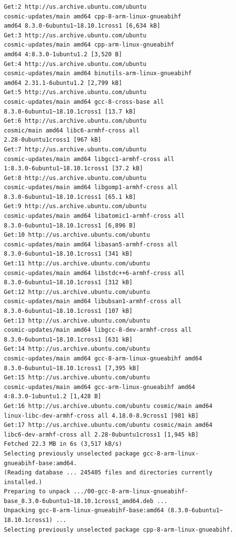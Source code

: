\begin{verbatim}
Get:2 http://us.archive.ubuntu.com/ubuntu 
cosmic-updates/main amd64 cpp-8-arm-linux-gnueabihf 
amd64 8.3.0-6ubuntu1~18.10.1cross1 [6,634 kB]
Get:3 http://us.archive.ubuntu.com/ubuntu 
cosmic-updates/main amd64 cpp-arm-linux-gnueabihf 
amd64 4:8.3.0-1ubuntu1.2 [3,520 B]
Get:4 http://us.archive.ubuntu.com/ubuntu 
cosmic-updates/main amd64 binutils-arm-linux-gnueabihf 
amd64 2.31.1-6ubuntu1.2 [2,799 kB]
Get:5 http://us.archive.ubuntu.com/ubuntu 
cosmic-updates/main amd64 gcc-8-cross-base all 
8.3.0-6ubuntu1~18.10.1cross1 [13.7 kB]
Get:6 http://us.archive.ubuntu.com/ubuntu 
cosmic/main amd64 libc6-armhf-cross all 
2.28-0ubuntu1cross1 [967 kB]
Get:7 http://us.archive.ubuntu.com/ubuntu 
cosmic-updates/main amd64 libgcc1-armhf-cross all 
1:8.3.0-6ubuntu1~18.10.1cross1 [37.2 kB]
Get:8 http://us.archive.ubuntu.com/ubuntu 
cosmic-updates/main amd64 libgomp1-armhf-cross all 
8.3.0-6ubuntu1~18.10.1cross1 [65.1 kB]
Get:9 http://us.archive.ubuntu.com/ubuntu 
cosmic-updates/main amd64 libatomic1-armhf-cross all 
8.3.0-6ubuntu1~18.10.1cross1 [6,896 B]
Get:10 http://us.archive.ubuntu.com/ubuntu 
cosmic-updates/main amd64 libasan5-armhf-cross all 
8.3.0-6ubuntu1~18.10.1cross1 [341 kB]
Get:11 http://us.archive.ubuntu.com/ubuntu 
cosmic-updates/main amd64 libstdc++6-armhf-cross all 
8.3.0-6ubuntu1~18.10.1cross1 [312 kB]
Get:12 http://us.archive.ubuntu.com/ubuntu 
cosmic-updates/main amd64 libubsan1-armhf-cross all 
8.3.0-6ubuntu1~18.10.1cross1 [107 kB]
Get:13 http://us.archive.ubuntu.com/ubuntu 
cosmic-updates/main amd64 libgcc-8-dev-armhf-cross all 
8.3.0-6ubuntu1~18.10.1cross1 [631 kB]
Get:14 http://us.archive.ubuntu.com/ubuntu 
cosmic-updates/main amd64 gcc-8-arm-linux-gnueabihf amd64 
8.3.0-6ubuntu1~18.10.1cross1 [7,395 kB]
Get:15 http://us.archive.ubuntu.com/ubuntu 
cosmic-updates/main amd64 gcc-arm-linux-gnueabihf amd64 
4:8.3.0-1ubuntu1.2 [1,428 B]
Get:16 http://us.archive.ubuntu.com/ubuntu cosmic/main amd64 
linux-libc-dev-armhf-cross all 4.18.0-8.9cross1 [981 kB]
Get:17 http://us.archive.ubuntu.com/ubuntu cosmic/main amd64 
libc6-dev-armhf-cross all 2.28-0ubuntu1cross1 [1,945 kB]
Fetched 22.3 MB in 6s (3,517 kB/s)                                                                         
Selecting previously unselected package gcc-8-arm-linux-
gnueabihf-base:amd64.
(Reading database ... 245405 files and directories currently 
installed.)
Preparing to unpack .../00-gcc-8-arm-linux-gnueabihf-
base_8.3.0-6ubuntu1~18.10.1cross1_amd64.deb ...
Unpacking gcc-8-arm-linux-gnueabihf-base:amd64 (8.3.0-6ubuntu1~
18.10.1cross1) ...
Selecting previously unselected package cpp-8-arm-linux-gnueabihf.

\end{verbatim}
